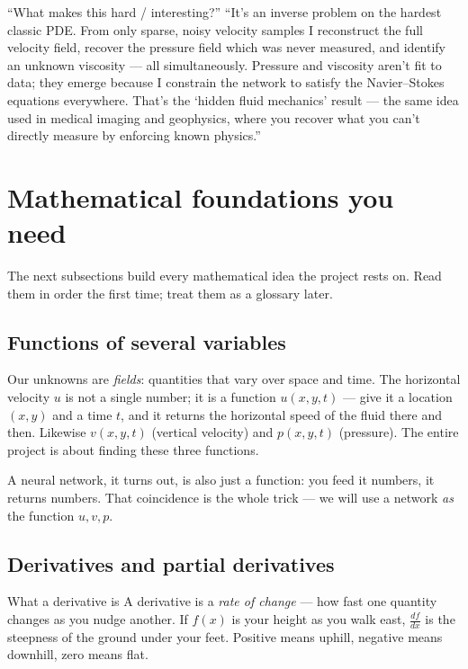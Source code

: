 \documentclass[11pt,a4paper]{article}
\begin{document}
\begin{defensebox}{``What makes this hard / interesting?''}
``It's an inverse problem on the hardest classic PDE. From only sparse, noisy
velocity samples I reconstruct the full velocity field, recover the pressure
field which was never measured, and identify an unknown viscosity --- all
simultaneously. Pressure and viscosity aren't fit to data; they emerge because
I constrain the network to satisfy the Navier--Stokes equations everywhere.
That's the `hidden fluid mechanics' result --- the same idea used in medical
imaging and geophysics, where you recover what you can't directly measure by
enforcing known physics.''
\end{defensebox}

\section{Mathematical foundations you need}
\label{sec:math-foundations}

The next subsections build every mathematical idea the project rests on. Read
them in order the first time; treat them as a glossary later.

\subsection{Functions of several variables}
\label{sec:multivar}

Our unknowns are \emph{fields}: quantities that vary over space and time. The
horizontal velocity $u$ is not a single number; it is a function
$u(x, y, t)$ --- give it a location $(x,y)$ and a time $t$, and it returns the
horizontal speed of the fluid there and then. Likewise $v(x,y,t)$ (vertical
velocity) and $p(x,y,t)$ (pressure). The entire project is about finding these
three functions.

A neural network, it turns out, is also just a function: you feed it numbers,
it returns numbers. That coincidence is the whole trick --- we will use a
network \emph{as} the function $u,v,p$.

\subsection{Derivatives and partial derivatives}
\label{sec:derivatives}

\begin{intuitionbox}{What a derivative is}
A derivative is a \emph{rate of change} --- how fast one quantity changes as you
nudge another. If $f(x)$ is your height as you walk east, $\frac{df}{dx}$ is the
steepness of the ground under your feet. Positive means uphill, negative means
downhill, zero means flat.
\end{intuitionbox}
\end{document}
